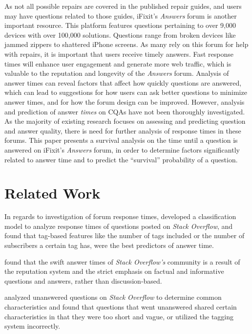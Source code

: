 \documentclass{article}
\begin{document}
As not all possible repairs are covered in the published repair guides, and users may have questions related to those guides, iFixit's \textit{Answers} forum is another important resource. This platform features questions pertaining to over 9,000 devices with over 100,000 solutions. Questions range from broken devices like jammed zippers to shattered iPhone screens. As many rely on this forum for help with repairs, it is important that users receive timely answers. Fast response times will enhance user engagement and generate more web traffic, which is valuable to the reputation and longevity of the \textit{Answers} forum. Analysis of answer times can reveal factors that affect how quickly questions are answered, which can lead to suggestions for how users can ask better questions to minimize answer times, and for how the forum design can be improved. 
However, analysis and prediction of answer \textit{times} on CQAs have not been thoroughly investigated. As the majority of existing research focuses on assessing and predicting question and answer quality, there is need for further analysis of response times in these forums. This paper presents a survival analysis on the time until a question is answered on iFixit's \textit{Answers} forum, in order to determine factors significantly related to answer time and to predict the ``survival'' probability of a question.


\section*{Related Work}
  
In regards to investigation of forum response times, \citep{Bhat2014} developed a classification model to analyze response times of questions posted on \textit{Stack Overflow}, and found that tag-based features like the number of tags included or the number of subscribers a certain tag has, were the best predictors of answer time. 

\citep{Mamykina2011} found that the swift answer times of \textit{Stack Overflow's} community is a result of the reputation system and the strict emphasis on factual and informative questions and answers, rather than discussion-based. 

\citep{Asaduzzaman2013} analyzed unanswered questions on \textit{Stack Overflow} to determine common characteristics and found that questions that went unanswered shared certain characteristics in that they were too short and vague, or utilized the tagging system incorrectly. 
\end{document}
